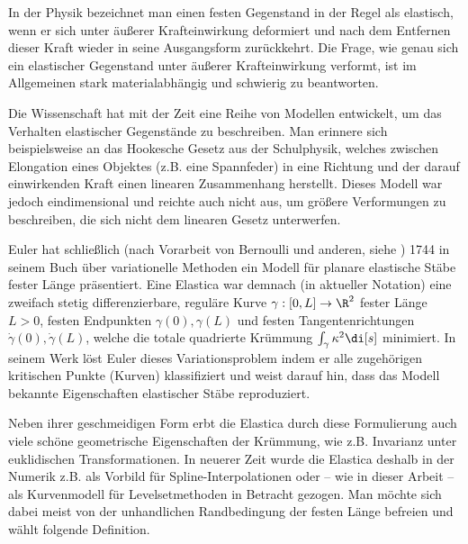 \documentclass{mythesis}
\begin{document}
In der Physik bezeichnet man einen festen Gegenstand in der Regel als elastisch, wenn er sich unter äußerer Krafteinwirkung deformiert und nach dem Entfernen dieser Kraft wieder in seine Ausgangsform zurückkehrt.
Die Frage, wie genau sich ein elastischer Gegenstand unter äußerer Krafteinwirkung verformt, ist im Allgemeinen stark materialabhängig und schwierig zu beantworten.

Die Wissenschaft hat mit der Zeit eine Reihe von Modellen entwickelt, um das Verhalten elastischer Gegenstände zu beschreiben.
Man erinnere sich beispielsweise an das Hookesche Gesetz aus der Schulphysik, welches zwischen Elongation eines Objektes (z.B. eine Spannfeder) in eine Richtung und der darauf einwirkenden Kraft einen linearen Zusammenhang herstellt.
Dieses Modell war jedoch eindimensional und reichte auch nicht aus, um größere Verformungen zu beschreiben, die sich nicht dem linearen Gesetz unterwerfen.

Euler hat schließlich (nach Vorarbeit von Bernoulli und anderen, siehe \cite{levien2008elastica}) 1744 in seinem Buch über variationelle Methoden \cite{euler1774methodus} ein Modell für planare elastische Stäbe fester Länge präsentiert.
Eine Elastica war demnach (in aktueller Notation) eine zweifach stetig differenzierbare, reguläre Kurve $\gamma: [0,L] \to \R^2$ fester Länge $L > 0$, festen Endpunkten $\gamma(0), \gamma(L)$ und festen Tangentenrichtungen $\dot \gamma(0), \dot \gamma(L)$, welche die totale quadrierte Krümmung
\begin{math}
    \int_\gamma \kappa^2 \di[s]
\end{math}
minimiert.
In seinem Werk löst Euler dieses Variationsproblem indem er alle zugehörigen kritischen Punkte (Kurven) klassifiziert und weist darauf hin, dass das Modell bekannte Eigenschaften elastischer Stäbe reproduziert.

Neben ihrer geschmeidigen Form erbt die Elastica durch diese Formulierung auch viele schöne geometrische Eigenschaften der Krümmung, wie z.B. Invarianz unter euklidischen Transformationen.
In neuerer Zeit wurde die Elastica deshalb in der Numerik z.B. als Vorbild für Spline-Interpolationen oder – wie in dieser Arbeit – als Kurvenmodell für Levelsetmethoden in Betracht gezogen.
Man möchte sich dabei meist von der unhandlichen Randbedingung der festen Länge befreien und wählt folgende Definition.
\end{document}

